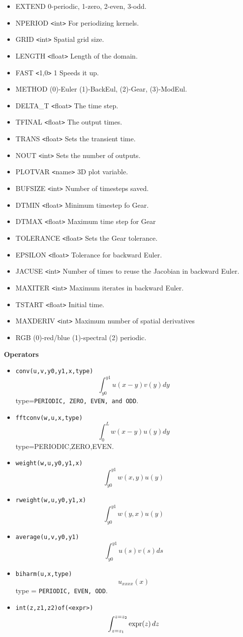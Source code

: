 \begin{itemize}
\item EXTEND 0-periodic, 1-zero, 2-even, 3-odd. 
\item NPERIOD {\tt<}int{\tt>} For periodizing kernels.
\item GRID {\tt<}int{\tt>} Spatial grid size.  
\item LENGTH {\tt<}float{\tt>} Length of the domain.
\item FAST {\tt<}1,0{\tt>} 1 Speeds it up.
\item METHOD (0)-Euler (1)-BackEul, (2)-Gear, (3)-ModEul. 
\item DELTA\_T {\tt<}float{\tt>}  The time step. 
\item TFINAL {\tt<}float{\tt>}  The output times.
\item TRANS {\tt<}float{\tt>}  Sets the transient time.
\item NOUT {\tt<}int{\tt>}  Sets the number of outputs.
\item PLOTVAR {\tt<}name{\tt>} 3D plot variable.
\item BUFSIZE {\tt<}int{\tt>} Number of timesteps saved.
\item DTMIN {\tt<}float{\tt>} Minimum timestep fo Gear.
\item DTMAX {\tt<}float{\tt>} Maximum time step for Gear
\item TOLERANCE {\tt<}float{\tt>} Sets the Gear tolerance.
\item EPSILON {\tt<}float{\tt>}  Tolerance for backward Euler.
\item JACUSE {\tt<}int{\tt>}  Number of times to reuse the Jacobian in backward Euler.
\item MAXITER {\tt<}int{\tt>} Maximum iterates in backward Euler.
\item TSTART {\tt<}float{\tt>} Initial time. 
\item MAXDERIV {\tt<}int{\tt>}  Maximum number of spatial derivatives 
\item RGB (0)-red/blue (1)-spectral (2) periodic.
\end{itemize}
\newpage
\begin{center}
{\bf \Large Operators}
\end{center}

\begin{itemize}
\item  {\tt conv(u,v,y0,y1,x,type)}  
\[
 \int_{y0}^{y1}u(x-y)v(y) dy
\]
type={\tt PERIODIC, ZERO, EVEN, and ODD}.
\item {\tt fftconv(w,u,x,type)}
\[
 \int_0^L w(x-y) u(y) dy
\]
type={PERIODIC,ZERO,EVEN}.
\item {\tt weight(w,u,y0,y1,x)} 
\[
\int_{y0}^{y1} w(x,y)u(y)
\]
\item {\tt rweight(w,u,y0,y1,x)} 
\[
\int_{y0}^{y1} w(y,x)u(y)
\]
\item {\tt average(u,v,y0,y1)} 
\[
\int_{y0}^{y1} u(s)v(s)ds
\]
\item {\tt biharm(u,x,type)} 
\[
 u_{xxxx}(x)
\]
type = {\tt  PERIODIC, EVEN, ODD}.
\item {\tt int(z,z1,z2)of(<expr>)}  
\[
\int_{z=z_1}^{z=z_2} \hbox{expr}(z) \, dz
\]
\end{itemize}





